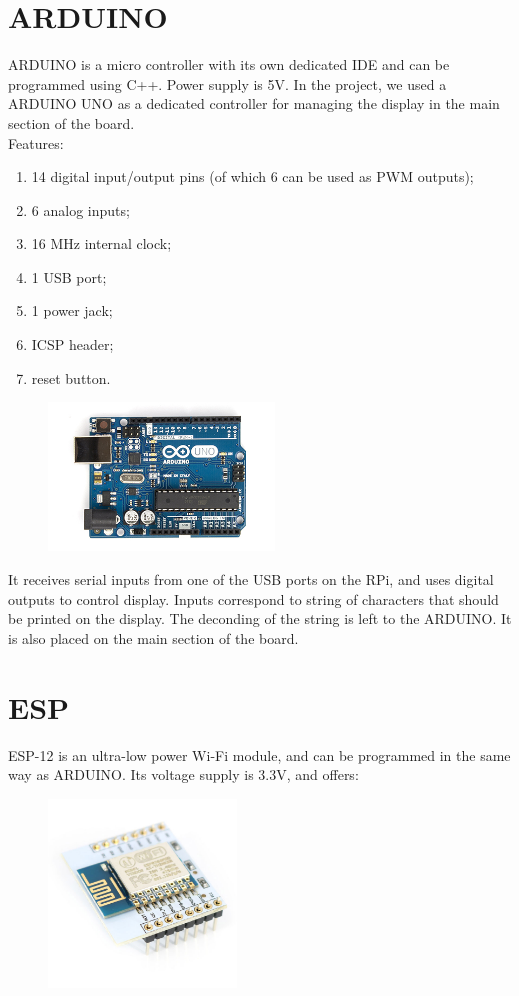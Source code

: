 \documentclass[a4paper,twoside]{book}
\begin{document}
\begin{appendices}
\section{ARDUINO}
\label{app:Arduino}
ARDUINO is a micro controller with its own dedicated IDE and can be programmed using C++. Power supply is 5V. In the project, we used a ARDUINO UNO as a dedicated controller for managing the display in the main section of the board. 
\\
Features:
\begin{enumerate}
\item 14 digital input/output pins (of which 6 can be used as PWM outputs);
\item 6 analog inputs;
\item 16 MHz internal clock;
\item 1 USB port;
\item 1 power jack;
\item ICSP header;
\item reset button.
\end{enumerate} 

\begin{figure}
    \centering
    \includegraphics[width=6cm]{img/ArduinoUno}
\end{figure}

It receives serial inputs from one of the USB ports on the RPi, and uses digital outputs to control display. Inputs correspond to string of characters that should be printed on the display. The deconding of the string is left to the ARDUINO. 
It is also placed on the main section of the board.

\section{ESP}
\label{app:ESP}
ESP-12  is an ultra-low power Wi-Fi module, and can be programmed in the same way as ARDUINO. Its voltage supply is 3.3V, and offers:

\begin{figure}[h]
    \centering
    \includegraphics[width=5cm]{img/ESP12}
\end{figure}


\end{appendices}
\end{document}
